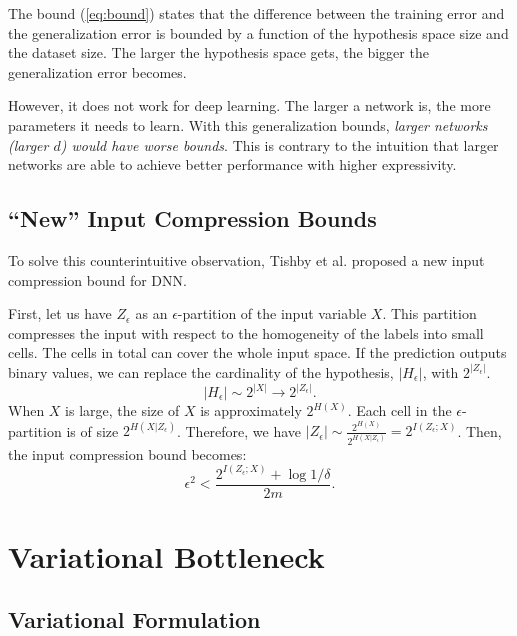\documentclass[11pt]{article}
\begin{document}
The bound (\ref{eq:bound}) states that the difference between the training error and the generalization error is bounded by a function of the hypothesis space size and the dataset size. The larger the hypothesis space gets, the bigger the generalization error becomes.

However, it does not work for deep learning. The larger a network is, the more parameters it needs to learn. With this generalization bounds, \emph{larger networks (larger $d$) would have worse bounds}. This is contrary to the intuition that larger networks are able to achieve better performance with higher expressivity.

\subsection*{``New'' Input Compression Bounds}

To solve this counterintuitive observation, Tishby et al. proposed a new input compression bound for DNN.

First, let us have $Z_\epsilon$ as an $\epsilon$-partition of the input variable $X$. This partition compresses the input with respect to the homogeneity of the labels into small cells. The cells in total can cover the whole input space. If the prediction outputs binary values, we can replace the cardinality of the hypothesis, $\vert H_\epsilon\vert$, with $2^{\vert Z_\epsilon\vert}$.
\begin{equation}
\vert H_\epsilon\vert \sim 2^{\vert X \vert} \rightarrow 2^{\vert Z_\epsilon\vert}.
\end{equation}
When $X$ is large, the size of $X$ is approximately $2^{H(X)}$. Each cell in the $\epsilon$-partition is of size $2^{H(X\vert Z_\epsilon)}$. Therefore, we have $\vert Z_\epsilon\vert\sim \frac{2^{H(X)}}{2^{H(X\vert Z_\epsilon)}} = 2^{I(Z_\epsilon;X)}$. Then, the input compression bound becomes:
\begin{equation}
\epsilon^2 < \frac{2^{I(Z_\epsilon;X)}+\log 1/\delta}{2m}.
\end{equation}

\section{Variational Bottleneck}

\subsection*{Variational Formulation}
\end{document}
